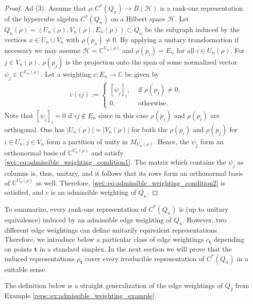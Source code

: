 \documentclass[a4paper]{amsart}
\newcommand{\C}{\mathbb{C}}
\begin{document}
\begin{proof}
    Ad (3). Assume that $\rho: C^\ast(Q_n) \to B(\mathcal{H})$ is a rank-one representation of the hypercube algebra $C^\ast(Q_n)$ on a Hilbert space $\mathcal{H}$. Let $Q_n(\rho) = (U_n(\rho), V_n(\rho), E_n(\rho)) \subset Q_n$ be the subgraph induced by the vertices $x \in U_n \cup V_n$ with $\rho(p_x) \neq 0$. By applying a unitary transformation if necessary we may assume $\mathcal{H} = \C^{U_n(\rho)}$ and $\rho(p_i) = E_{ii}$ for all $i \in U_n(\rho)$. For $j \in V_n(\rho)$, $\rho(p_j)$ is the projection onto the span of some normalized vector $\psi_j \in \C^{U_n(\rho)}$. Let a weighting $c: E_n \to \C$ be given by
    \begin{align*}
        c(ij) := \begin{cases}
            [\psi_j]_i,     & \text{ if } \rho(p_j) \neq 0, \\
            0,              & \text{ otherwise.}
        \end{cases} 
    \end{align*}
    Note that $[\psi_j]_i = 0$ if $ij \not \in E_n$ since in this case $\rho(p_j)$ and $\rho(p_i)$ are orthogonal.
    One has $|U_n(\rho)| = |V_n(\rho)|$ for both the $\rho(p_i)$ and $\rho(p_j)$ for $i \in U_n, j \in V_n$ form a partition of unity in $M_{U_n(\rho)}$. Hence, the $\psi_j$ form an orthonormal basis of $\C^{U_n(\rho)}$ and satisfy \eqref{wei::eq:admissible_weighting_condition1}. The matrix which contains the $\psi_j$ as columns is, thus, unitary, and it follows that its rows form an orthonormal basis of $\C^{U_n(\rho)}$ as well. Therefore, \eqref{wei::eq:admissible_weighting_condition2} is satisfied, and $c$ is an admissible weighting of $Q_n$.
\end{proof}

To summarize, every rank-one representation of $C^\ast(Q_n)$ is (up to unitary equivalence) induced by an admissible edge weighting of $Q_n$. However, two different edge weightings can define unitarily equivalent representations. Therefore, we introduce below a particular class of edge weightings $c_\mathbf{t}$ depending on points $\mathbf{t}$ in a standard simplex. In the next section we will prove that the induced representations $\rho_\mathbf{t}$ cover every irreducible representation of $C^\ast(Q_n)$ in a suitable sense.

The definition below is a straight generalization of the edge weightings of $Q_2$ from Example \ref{reps::ex:admissible_weighting_example}.
\end{document}
